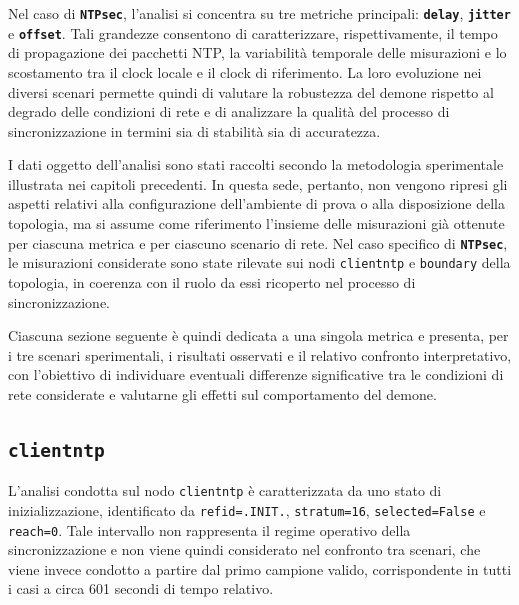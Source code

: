 Nel caso di \texttt{\textbf{NTPsec}}, l’analisi si concentra su tre metriche principali:
\texttt{\textbf{delay}}, \texttt{\textbf{jitter}} e \texttt{\textbf{offset}}. Tali
grandezze consentono di caratterizzare, rispettivamente, il tempo di propagazione
dei pacchetti NTP, la variabilità temporale delle misurazioni e lo scostamento
tra il clock locale e il clock di riferimento. La loro evoluzione nei diversi scenari
permette quindi di valutare la robustezza del demone rispetto al degrado delle condizioni
di rete e di analizzare la qualità del processo di sincronizzazione in termini sia
di stabilità sia di accuratezza.

I dati oggetto dell’analisi sono stati raccolti secondo la metodologia sperimentale
illustrata nei capitoli precedenti. In questa sede, pertanto, non vengono
ripresi gli aspetti relativi alla configurazione dell’ambiente di prova o alla
disposizione della topologia, ma si assume come riferimento l’insieme delle misurazioni
già ottenute per ciascuna metrica e per ciascuno scenario di rete. Nel caso
specifico di \texttt{\textbf{NTPsec}}, le misurazioni considerate sono state
rilevate sui nodi \texttt{clientntp} e \texttt{boundary} della topologia, in coerenza
con il ruolo da essi ricoperto nel processo di sincronizzazione.

Ciascuna sezione seguente è quindi dedicata a una singola metrica e presenta,
per i tre scenari sperimentali, i risultati osservati e il relativo confronto interpretativo,
con l’obiettivo di individuare eventuali differenze significative tra le
condizioni di rete considerate e valutarne gli effetti sul comportamento del
demone.

\newpage
\subsection{\texttt{clientntp}}
L'analisi condotta sul nodo \texttt{clientntp} è caratterizzata da uno stato di inizializzazione,
identificato da \texttt{refid=.INIT.}, \texttt{stratum=16}, \texttt{selected=False}
e \texttt{reach=0}. Tale intervallo non rappresenta il regime operativo della sincronizzazione
e non viene quindi considerato nel confronto tra scenari, che viene invece
condotto a partire dal primo campione valido, corrispondente in tutti i casi a circa
601 secondi di tempo relativo.
